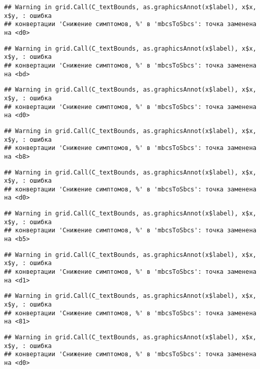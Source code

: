 \documentclass[
]{article}
\begin{document}
\begin{verbatim}
## Warning in grid.Call(C_textBounds, as.graphicsAnnot(x$label), x$x, x$y, : ошибка
## конвертации 'Снижение симптомов, %' в 'mbcsToSbcs': точка заменена на <d0>
\end{verbatim}

\begin{verbatim}
## Warning in grid.Call(C_textBounds, as.graphicsAnnot(x$label), x$x, x$y, : ошибка
## конвертации 'Снижение симптомов, %' в 'mbcsToSbcs': точка заменена на <bd>
\end{verbatim}

\begin{verbatim}
## Warning in grid.Call(C_textBounds, as.graphicsAnnot(x$label), x$x, x$y, : ошибка
## конвертации 'Снижение симптомов, %' в 'mbcsToSbcs': точка заменена на <d0>
\end{verbatim}

\begin{verbatim}
## Warning in grid.Call(C_textBounds, as.graphicsAnnot(x$label), x$x, x$y, : ошибка
## конвертации 'Снижение симптомов, %' в 'mbcsToSbcs': точка заменена на <b8>
\end{verbatim}

\begin{verbatim}
## Warning in grid.Call(C_textBounds, as.graphicsAnnot(x$label), x$x, x$y, : ошибка
## конвертации 'Снижение симптомов, %' в 'mbcsToSbcs': точка заменена на <d0>
\end{verbatim}

\begin{verbatim}
## Warning in grid.Call(C_textBounds, as.graphicsAnnot(x$label), x$x, x$y, : ошибка
## конвертации 'Снижение симптомов, %' в 'mbcsToSbcs': точка заменена на <b5>
\end{verbatim}

\begin{verbatim}
## Warning in grid.Call(C_textBounds, as.graphicsAnnot(x$label), x$x, x$y, : ошибка
## конвертации 'Снижение симптомов, %' в 'mbcsToSbcs': точка заменена на <d1>
\end{verbatim}

\begin{verbatim}
## Warning in grid.Call(C_textBounds, as.graphicsAnnot(x$label), x$x, x$y, : ошибка
## конвертации 'Снижение симптомов, %' в 'mbcsToSbcs': точка заменена на <81>
\end{verbatim}

\begin{verbatim}
## Warning in grid.Call(C_textBounds, as.graphicsAnnot(x$label), x$x, x$y, : ошибка
## конвертации 'Снижение симптомов, %' в 'mbcsToSbcs': точка заменена на <d0>
\end{verbatim}
\end{document}
